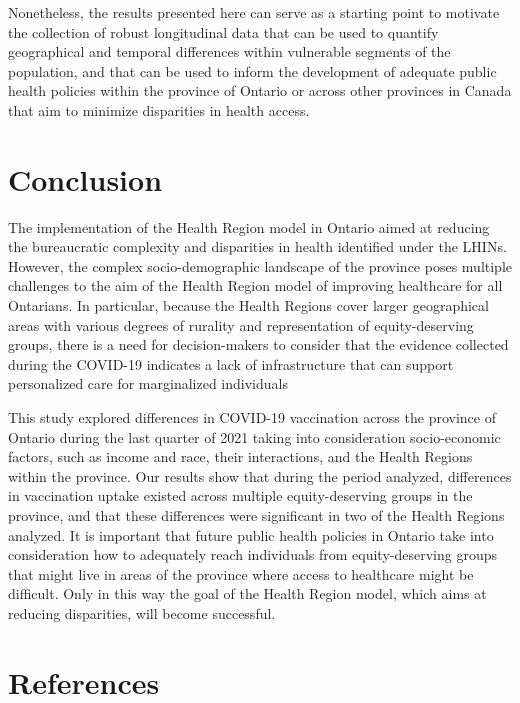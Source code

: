 \documentclass[
  letterpaper,
  DIV=11,
  numbers=noendperiod]{scrartcl}
\begin{document}
Nonetheless, the results presented here can serve as a starting point to
motivate the collection of robust longitudinal data that can be used to
quantify geographical and temporal differences within vulnerable
segments of the population, and that can be used to inform the
development of adequate public health policies within the province of
Ontario or across other provinces in Canada that aim to minimize
disparities in health access.

\hypertarget{conclusion}{%
\section{Conclusion}\label{conclusion}}

The implementation of the Health Region model in Ontario aimed at
reducing the bureaucratic complexity and disparities in health
identified under the LHINs. However, the complex socio-demographic
landscape of the province poses multiple challenges to the aim of the
Health Region model of improving healthcare for all Ontarians. In
particular, because the Health Regions cover larger geographical areas
with various degrees of rurality and representation of equity-deserving
groups, there is a need for decision-makers to consider that the
evidence collected during the COVID-19 indicates a lack of
infrastructure that can support personalized care for marginalized
individuals

This study explored differences in COVID-19 vaccination across the
province of Ontario during the last quarter of 2021 taking into
consideration socio-economic factors, such as income and race, their
interactions, and the Health Regions within the province. Our results
show that during the period analyzed, differences in vaccination uptake
existed across multiple equity-deserving groups in the province, and
that these differences were significant in two of the Health Regions
analyzed. It is important that future public health policies in Ontario
take into consideration how to adequately reach individuals from
equity-deserving groups that might live in areas of the province where
access to healthcare might be difficult. Only in this way the goal of
the Health Region model, which aims at reducing disparities, will become
successful.

\hypertarget{references}{%
\section{References}\label{references}}
\end{document}
